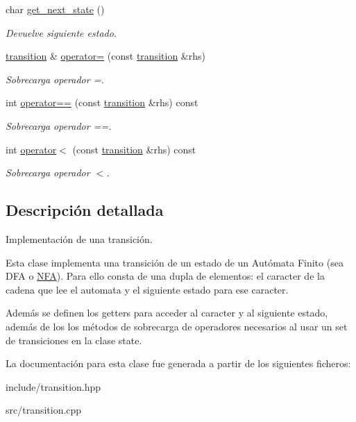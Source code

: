 \begin{DoxyCompactItemize}
\mbox{\label{classtransition_ae61d6267fd639c7c9c33110690380d02}} 
char \mbox{\hyperlink{classtransition_ae61d6267fd639c7c9c33110690380d02}{get\+\_\+next\+\_\+state}} ()
\begin{DoxyCompactList}\small\item\em Devuelve siguiente estado. \end{DoxyCompactList}\item 
\mbox{\label{classtransition_a19ff0a62d44b9e704c0d0febb5d4b935}} 
\mbox{\hyperlink{classtransition}{transition}} \& \mbox{\hyperlink{classtransition_a19ff0a62d44b9e704c0d0febb5d4b935}{operator=}} (const \mbox{\hyperlink{classtransition}{transition}} \&rhs)
\begin{DoxyCompactList}\small\item\em Sobrecarga operador =. \end{DoxyCompactList}\item 
\mbox{\label{classtransition_aec5d35db88d6f0e23bad3e6d54cb2795}} 
int \mbox{\hyperlink{classtransition_aec5d35db88d6f0e23bad3e6d54cb2795}{operator==}} (const \mbox{\hyperlink{classtransition}{transition}} \&rhs) const
\begin{DoxyCompactList}\small\item\em Sobrecarga operador ==. \end{DoxyCompactList}\item 
\mbox{\label{classtransition_ae7d0d78dff4788d1d69447f82918e701}} 
int \mbox{\hyperlink{classtransition_ae7d0d78dff4788d1d69447f82918e701}{operator$<$}} (const \mbox{\hyperlink{classtransition}{transition}} \&rhs) const
\begin{DoxyCompactList}\small\item\em Sobrecarga operador $<$. \end{DoxyCompactList}\end{DoxyCompactItemize}


\subsection{Descripción detallada}
Implementación de una transición. 

Esta clase implementa una transición de un estado de un Autómata Finito (sea D\+FA o \mbox{\hyperlink{class_n_f_a}{N\+FA}}). Para ello consta de una dupla de elementos\+: el caracter de la cadena que lee el automata y el siguiente estado para ese caracter.

Además se definen los getters para acceder al caracter y al siguiente estado, además de los los métodos de sobrecarga de operadores necesarios al usar un set de transiciones en la clase state. 

La documentación para esta clase fue generada a partir de los siguientes ficheros\+:\begin{DoxyCompactItemize}
\item 
include/transition.\+hpp\item 
src/transition.\+cpp\end{DoxyCompactItemize}
